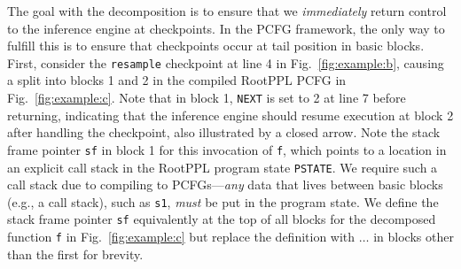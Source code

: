 \documentclass[runningheads]{llncs}
\newcommand{\rlstinline}{\lstinline[language=RootPPL]}
\newcommand{\clstinline}{\lstinline[language=CorePPL]}
\begin{document}
The goal with the decomposition is to ensure that we \emph{immediately} return control to the inference engine at checkpoints.
In the PCFG framework, the only way to fulfill this is to ensure that checkpoints occur at tail position in basic blocks.
First, consider the \clstinline!resample! checkpoint at line 4 in Fig.~\ref{fig:example:b}, causing a split into blocks 1 and 2 in the compiled RootPPL PCFG in Fig.~\ref{fig:example:c}.
Note that in block 1, \rlstinline!NEXT! is set to 2 at line 7 before returning, indicating that the inference engine should resume execution at block 2 after handling the checkpoint, also illustrated by a closed arrow.
Note the stack frame pointer \rlstinline!sf! in block 1 for this invocation of \lstinline!f!, which points to a location in an explicit call stack in the RootPPL program state \rlstinline!PSTATE!.
We require such a call stack due to compiling to PCFGs---\emph{any} data that lives between basic blocks (e.g., a call stack), such as \lstinline!s1!, \emph{must} be put in the program state.
We define the stack frame pointer \rlstinline!sf! equivalently at the top of all blocks for the decomposed function \clstinline!f! in Fig.~\ref{fig:example:c} but replace the definition with $\ldots$ in blocks other than the first for brevity.
\end{document}
